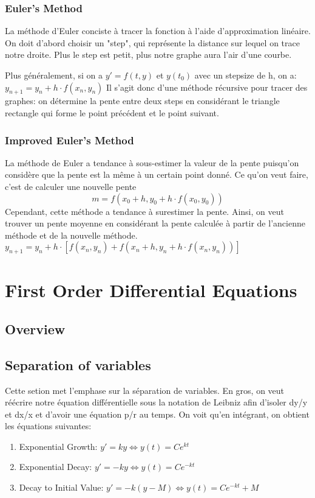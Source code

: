 \documentclass{article}
\begin{document}
\subsubsection{Euler's Method}

La méthode d'Euler conciste à tracer la fonction à l'aide d'approximation
linéaire. On doit d'abord choisir un "step", qui représente la distance
sur lequel on trace notre droite. Plus le step est petit, plus notre graphe
aura l'air d'une courbe.

Plus généralement, si on a $ y' = f(t,y)$ et $ y(t_0)$ avec un stepsize
de h, on a:
$ y_{n+1} = y_n + h \cdot f(x_n, y_n)$
Il s'agit donc d'une méthode récursive pour tracer des graphes:
on détermine la pente entre deux steps en considérant le triangle
rectangle qui forme le point précédent et le point suivant.

\subsubsection{Improved Euler's Method}%
\label{ssub:Improved Euler's Method}

La méthode de Euler a tendance à sous-estimer la valeur de la pente
puisqu'on considère que la pente est la même à un certain point donné.
Ce qu'on veut faire, c'est de calculer une nouvelle pente
$$ m = f(x_0 + h, y_0 + h \cdot f(x_0, y_0)) $$
Cependant, cette méthode a tendance à surestimer la pente. Ainsi, on veut
trouver un pente moyenne en considérant la pente calculée à partir de
l'ancienne méthode et de la nouvelle méthode.
$ y_{n+1} = y_n + h \cdot [f(x_n, y_n) + f(x_n+h, y_n + h \cdot
f(x_n, y_n))]$

\pagebreak
\section{First Order Differential Equations}
\subsection*{Overview}

\subsection{Separation of variables}

Cette setion met l'emphase sur la séparation de variables. En gros, on
veut réécrire notre équation différentielle sous la notation de Leibniz
afin d'isoler dy/y et dx/x et d'avoir une équation p/r au temps. On voit
qu'en intégrant, on obtient les équations suivantes:
\begin{enumerate}
    \item Exponential Growth: $ y' = ky \Longleftrightarrow y(t) = C e^{kt} $
    \item Exponential Decay: $ y' = -ky \Longleftrightarrow y(t) = C e^{-kt} $
    \item Decay to Initial Value: $ y' = -k (y-M) \Longleftrightarrow
	y(t) = C e^{-kt} + M $
\end{enumerate}
\end{document}
